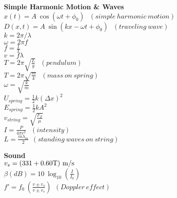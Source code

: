 \documentclass[12pt]{article}
\begin{document}
\begin{twocolumn}
\begin{flushleft}
{\bf Simple Harmonic Motion \& Waves} \\
\bigskip
$\displaystyle x(t) = A~ \cos(\omega t + \phi_0)~~~(simple~harmonic~motion)$\\
\medskip
$\displaystyle D(x,t) = A~ \sin(k x - \omega t + \phi_0)~~~(traveling~wave)$\\
\medskip
$\displaystyle k = 2 \pi / \lambda $ \\
\medskip
$\displaystyle \omega = 2 \pi f $ \\
\medskip
$\displaystyle f = \frac{1}{T} $ \\
\medskip
$\displaystyle v = f \lambda $ \\
\medskip
$\displaystyle T = 2 \pi \sqrt{\frac{L}{g}}  ~~~(pendulum)$\\
\medskip
$\displaystyle T = 2 \pi \sqrt{\frac{m}{k}} ~~~(mass \ on\  spring)$\\
\medskip
$\displaystyle \omega = \sqrt{\frac{k}{m}} $\\
\medskip
$\displaystyle U_{spring} = \frac{1}{2} k (\Delta x)^2$\\
\medskip
$\displaystyle E_{spring} = \frac{1}{2} k A^2$\\
\medskip
$\displaystyle v_{string} = \sqrt{\frac{F_T}{\mu}} $ \\
\medskip
$\displaystyle I = \frac{P}{4 \pi r^2} ~~~(intensity)$ \\
\medskip
$\displaystyle L = \frac{m \lambda_m}{2} ~~(standing ~ waves ~ on ~ 
string)$ \\ 
\medskip

{\bf Sound} \\
\bigskip
$\displaystyle v_s = (331 + 0.60 \rm T)~\rm m/s$ \\
\medskip
$\displaystyle \beta (dB) = 10~\log_{10}\left(\frac{I}{I_0}\right) $ \\ 
\medskip
$\displaystyle f' = f_0~ \left(\frac{v \pm v_o}{v \pm
  v_s}\right)~~(Doppler~effect)$ 
\\ 
\bigskip


\end{flushleft}
\end{twocolumn}
\end{document}
